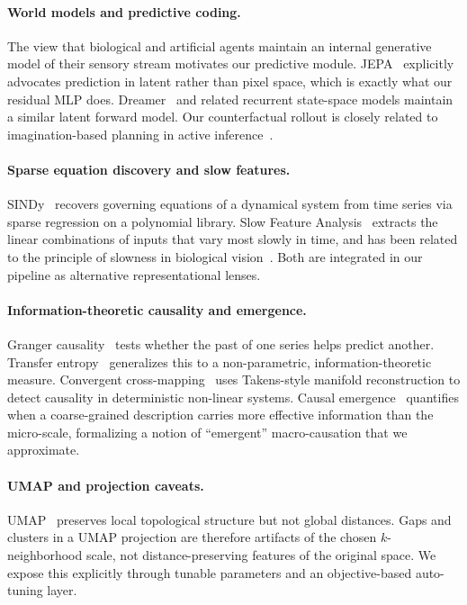 \documentclass[11pt,a4paper]{article}
\begin{document}
\paragraph{World models and predictive coding.}
The view that biological and artificial agents maintain an internal
generative model of their sensory stream
\cite{friston2010free, rao1999predictive} motivates our predictive
module. JEPA~\cite{lecun2022path} explicitly advocates
prediction in latent rather than pixel space, which is exactly
what our residual MLP does. Dreamer~\cite{hafner2020dream} and
related recurrent state-space models maintain a similar latent
forward model. Our counterfactual rollout is closely related to
imagination-based planning in active inference~\cite{kaplan2018planning}.

\paragraph{Sparse equation discovery and slow features.}
SINDy~\cite{brunton2016sindy} recovers governing equations of a
dynamical system from time series via sparse regression on a
polynomial library. Slow Feature Analysis~\cite{wiskott2002slow}
extracts the linear combinations of inputs that vary most slowly
in time, and has been related to the principle of slowness in
biological vision~\cite{berkes2005slow}. Both are integrated
in our pipeline as alternative representational lenses.

\paragraph{Information-theoretic causality and emergence.}
Granger causality~\cite{granger1969} tests whether the past of one
series helps predict another. Transfer entropy~\cite{schreiber2000te}
generalizes this to a non-parametric, information-theoretic measure.
Convergent cross-mapping~\cite{sugihara2012ccm} uses Takens-style
manifold reconstruction to detect causality in deterministic
non-linear systems. Causal emergence~\cite{hoel2013quantifying}
quantifies when a coarse-grained description carries more
effective information than the micro-scale, formalizing a notion of
``emergent'' macro-causation that we approximate.

\paragraph{UMAP and projection caveats.}
UMAP~\cite{mcinnes2018umap} preserves local topological structure
but not global distances. Gaps and clusters in a UMAP projection are
therefore artifacts of the chosen $k$-neighborhood scale, not
distance-preserving features of the original space. We expose this
explicitly through tunable parameters and an objective-based
auto-tuning layer.
\end{document}
